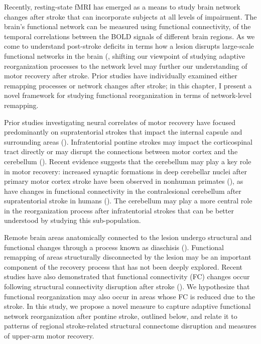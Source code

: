 \documentclass[phd,tocprelim]{cornell}
\begin{document}
Recently, resting-state fMRI has emerged as a means to study brain network changes after stroke that can incorporate subjects at all levels of impairment. The brain's functional network can be measured using functional connectivity,  of the temporal correlations between the BOLD signals of different brain regions.  As we come to understand post-stroke deficits in terms how a lesion disrupts large-scale functional networks in the brain (\cite{Carrera2014-ah, Griffis2019-cy}, shifting our viewpoint of studying adaptive reorganization processes to the network level may further our understanding of motor recovery after stroke.  Prior studies have individually examined either remapping processes or network changes after stroke; in this chapter, I present a novel framework for studying functional reorganization in terms of network-level remapping. 

	Prior studies investigating neural correlates of motor recovery have focused predominantly on supratentorial strokes that impact the internal capsule and surrounding areas (\cite{Lekic2011-pt}). Infratentorial pontine strokes may impact the corticospinal tract directly or may disrupt the connections between motor cortex and the cerebellum (\cite{Lu2011-ow}). Recent evidence suggests that the cerebellum may play a key role in motor recovery: increased synaptic formations in deep cerebellar nuclei after primary motor cortex stroke have been observed in nonhuman primates (\cite{Yamamoto2019-ru}), as have changes in functional connectivity in the contralesional cerebellum after supratentorial stroke in humans (\cite{Wang2010-or,Liu2019-mj}). The cerebellum may play a more central role in the reorganization process after infratentorial strokes that can be better understood by studying this sub-population.
	
    Remote brain areas anatomically connected to the lesion undergo structural and functional changes through a process known as diaschisis (\cite{Carrera2014-ah}). Functional remapping of areas structurally disconnected by the lesion may be an important component of the recovery process that has not been deeply explored. Recent studies have also demonstrated that functional connectivity (FC) changes occur following structural connectivity disruption after stroke (\cite{Lu2011-ow, Griffis2020-hx}). We hypothesize that functional reorganization may also occur in areas whose FC is reduced due to the stroke. In this study, we propose a novel measure to capture adaptive functional network reorganization after pontine stroke, outlined below, and relate it to patterns of regional stroke-related structural connectome disruption and measures of upper-arm motor recovery. 
\end{document}
